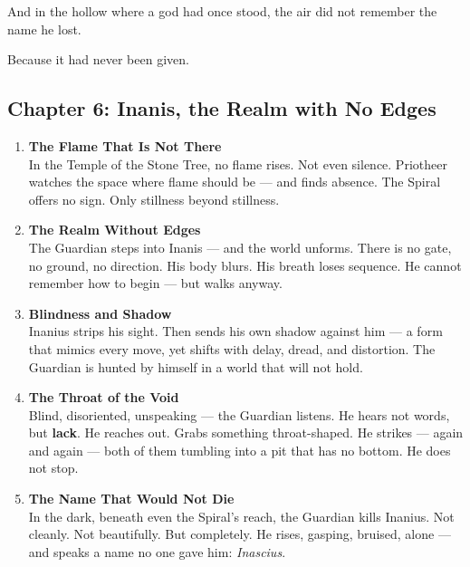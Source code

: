 \documentclass[9pt]{article}
\begin{document}
\vspace{0.5em}
And in the hollow where a god had once stood, the air did not remember the name he lost.

\vspace{0.5em}
Because it had never been given.


\newpage

\subsection*{Chapter 6: Inanis, the Realm with No Edges}

\vspace{1in}

\begin{enumerate}
    \item \textbf{The Flame That Is Not There} \\
    In the Temple of the Stone Tree, no flame rises. Not even silence. Priotheer watches the space where flame should be — and finds absence. The Spiral offers no sign. Only stillness beyond stillness.

    \vspace{1em}
    \item \textbf{The Realm Without Edges} \\
    The Guardian steps into Inanis — and the world unforms. There is no gate, no ground, no direction. His body blurs. His breath loses sequence. He cannot remember how to begin — but walks anyway.

    \vspace{1em}
    \item \textbf{Blindness and Shadow} \\
    Inanius strips his sight. Then sends his own shadow against him — a form that mimics every move, yet shifts with delay, dread, and distortion. The Guardian is hunted by himself in a world that will not hold.

    \vspace{1em}
    \item \textbf{The Throat of the Void} \\
    Blind, disoriented, unspeaking — the Guardian listens. He hears not words, but \textbf{lack}. He reaches out. Grabs something throat-shaped. He strikes — again and again — both of them tumbling into a pit that has no bottom. He does not stop.

    \vspace{1em}
    \item \textbf{The Name That Would Not Die} \\
    In the dark, beneath even the Spiral’s reach, the Guardian kills Inanius. Not cleanly. Not beautifully. But completely. He rises, gasping, bruised, alone — and speaks a name no one gave him: \textit{Inascius}.


\end{enumerate}
\end{document}
